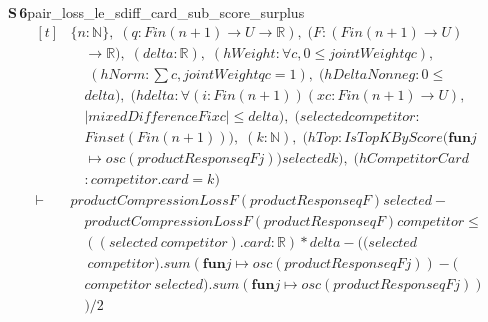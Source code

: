 \documentclass[conference]{IEEEtran}
\theoremstyle{definition}
\newcommand{\lean}[1]{\textsf{\footnotesize #1}}
\begin{document}
\noindent\textbf{S\,6}\quad\lean{pair\_loss\_le\_sdiff\_card\_sub\_score\_surplus}
{\footnotesize\[ \begin{aligned}[t]
&\{ \mathit{n} : \mathbb{N} \},\; (\mathit{q} : \mathit{Fin} (\mathit{n} + 1) \to \mathit{U} \to \mathbb{R} ),\; (\mathit{F} : (\mathit{Fin} (\mathit{n} + 1) \to \mathit{U})\\
&\quad \to \mathbb{R} ),\; (\mathit{delta} : \mathbb{R} ),\; (\mathit{hWeight} : \forall \mathit{c}, 0 \leq \mathit{jointWeight} \mathit{q} \mathit{c}),\\
&\quad \; (\mathit{hNorm} : \textstyle\sum \mathit{c}, \mathit{jointWeight} \mathit{q} \mathit{c} = 1),\; (\mathit{hDeltaNonneg} : 0 \leq\\
&\quad \mathit{delta}),\; (\mathit{hdelta} : \forall (\mathit{i} : \mathit{Fin} (\mathit{n} + 1)) (\mathit{x} \mathit{c} : \mathit{Fin} (\mathit{n} + 1) \to \mathit{U}),\\
&\quad |\mathit{mixedDifference} \mathit{F} \mathit{i} \mathit{x} \mathit{c}| \leq \mathit{delta}),\; (\mathit{selected} \mathit{competitor} :\\
&\quad \mathit{Finset} (\mathit{Fin} (\mathit{n} + 1))),\; (\mathit{k} : \mathbb{N} ),\; (\mathit{hTop} : \mathit{IsTopKByScore} (\mathbf{fun} \mathit{j}\\
&\quad \mapsto \mathit{osc} (\mathit{productResponse} \mathit{q} \mathit{F} \mathit{j})) \mathit{selected} \mathit{k}),\; (\mathit{hCompetitorCard}\\
&\quad : \mathit{competitor}.\mathit{card} = \mathit{k})\\
\vdash\;&\mathit{productCompressionLoss} \mathit{F} (\mathit{productResponse} \mathit{q} \mathit{F}) \mathit{selected} -\\
&\quad \mathit{productCompressionLoss} \mathit{F} (\mathit{productResponse} \mathit{q} \mathit{F}) \mathit{competitor} \leq\\
&\quad ((\mathit{selected} \ \mathit{competitor}).\mathit{card} : \mathbb{R} ) * \mathit{delta} - ((\mathit{selected}\\
&\quad \ \mathit{competitor}).\mathit{sum} (\mathbf{fun} \mathit{j} \mapsto \mathit{osc} (\mathit{productResponse} \mathit{q} \mathit{F} \mathit{j})) - (\\
&\quad \mathit{competitor} \ \mathit{selected}).\mathit{sum} (\mathbf{fun} \mathit{j} \mapsto \mathit{osc} (\mathit{productResponse} \mathit{q} \mathit{F} \mathit{j}))\\
&\quad ) / 2
\end{aligned} \]}
\end{document}

